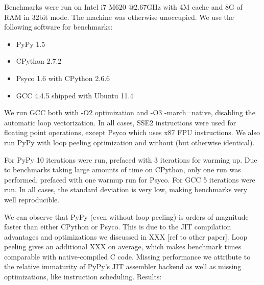 \documentclass[preprint]{sigplanconf}
\begin{document}
Benchmarks were run on Intel i7 M620 @2.67GHz with 4M cache and 8G of RAM in
32bit mode.
The machine was otherwise unoccupied. We use the following software
for benchmarks:

\begin{itemize}
\item PyPy 1.5
\item CPython 2.7.2
\item Psyco 1.6 with CPython 2.6.6
\item GCC 4.4.5 shipped with Ubuntu 11.4
\end{itemize}

We run GCC both with -O2 optimization and -O3 -march=native, disabling the
automatic loop vectorization. In all cases, SSE2 instructions were used for
floating point operations, except Psyco which uses x87 FPU instructions.
We also run PyPy with loop peeling optimization and without (but otherwise
identical).

For PyPy 10 iterations were run, prefaced with 3 iterations for warming up.
Due to benchmarks taking large amounts of time on CPython, only one run
was performed, prefaced with one warmup run for Psyco.
For GCC 5 iterations
were run. In all cases, the standard deviation is very low, making benchmarks
very well reproducible.

We can observe that PyPy (even without loop peeling) is orders of magnitude
faster than either CPython or Psyco. This is due to the JIT compilation
advantages and optimizations we discussed in XXX [ref to other paper]. Loop
peeling gives an additional XXX on average, which makes benchmark times
comparable with native-compiled C code. Missing performance we attribute to
the relative immaturity of PyPy's JIT assembler backend as well as missing
optimizations, like instruction scheduling. Results:
\end{document}
